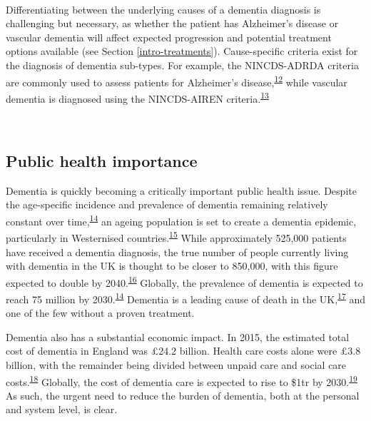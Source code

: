 \documentclass[a4paper, twoside]{templates/ociamthesis}
\begin{document}
~

Differentiating between the underlying causes of a dementia diagnosis is challenging but necessary, as whether the patient has Alzheimer's disease or vascular dementia will affect expected progression and potential treatment options available (see Section \ref{intro-treatments}). Cause-specific criteria exist for the diagnosis of dementia sub-types. For example, the NINCDS-ADRDA criteria are commonly used to assess patients for Alzheimer's disease,\textsuperscript{\protect\hyperlink{ref-dubois2007}{12}} while vascular dementia is diagnosed using the NINCDS-AIREN criteria.\textsuperscript{\protect\hyperlink{ref-roman1993}{13}}

~

\hypertarget{public-health-importance}{%
\subsection{Public health importance}\label{public-health-importance}}

Dementia is quickly becoming a critically important public health issue. Despite the age-specific incidence and prevalence of dementia remaining relatively constant over time,\textsuperscript{\protect\hyperlink{ref-prince2016}{14}} an ageing population is set to create a dementia epidemic, particularly in Westernised countries.\textsuperscript{\protect\hyperlink{ref-flier2005}{15}} While approximately 525,000 patients have received a dementia diagnosis, the true number of people currently living with dementia in the UK is thought to be closer to 850,000, with this figure expected to double by 2040.\textsuperscript{\protect\hyperlink{ref-baker2019}{16}} Globally, the prevalence of dementia is expected to reach 75 million by 2030.\textsuperscript{\protect\hyperlink{ref-prince2016}{14}} Dementia is a leading cause of death in the UK,\textsuperscript{\protect\hyperlink{ref-zotero-15757}{17}} and one of the few without a proven treatment.

Dementia also has a substantial economic impact. In 2015, the estimated total cost of dementia in England was £24.2 billion. Health care costs alone were £3.8 billion, with the remainder being divided between unpaid care and social care costs.\textsuperscript{\protect\hyperlink{ref-wittenberg2019}{18}} Globally, the cost of dementia care is expected to rise to \$1tr by 2030.\textsuperscript{\protect\hyperlink{ref-prince2014}{19}} As such, the urgent need to reduce the burden of dementia, both at the personal and system level, is clear.
\end{document}
